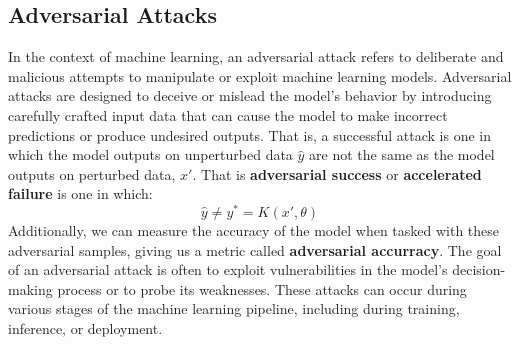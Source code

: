 \documentclass[conference]{IEEEtran}
\begin{document}
\subsection{Adversarial Attacks}
\label{attacks}
In the context of machine learning, an adversarial attack refers to deliberate and malicious attempts to manipulate or exploit machine learning models. Adversarial attacks are designed to deceive or mislead the model's behavior by introducing carefully crafted input data that can cause the model to make incorrect predictions or produce undesired outputs. That is, a successful attack is one in which the model outputs on unperturbed data $\hat{y}$ are not the same as the model outputs on perturbed data, $x'$. That is \textbf{adversarial success} or \textbf{accelerated failure} is one in which:
\begin{equation}
\hat{y} \neq y^* = K(x', \theta)
\label{eq:adv_success}
\end{equation}
Additionally, we can measure the accuracy of the model when tasked with these adversarial samples, giving us a metric called \textbf{adversarial accurracy}. The goal of an adversarial attack is often to exploit vulnerabilities in the model's decision-making process or to probe its weaknesses. These attacks can occur during various stages of the machine learning pipeline, including during training, inference, or deployment. 
\end{document}
